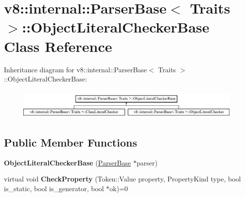 \hypertarget{classv8_1_1internal_1_1_parser_base_1_1_object_literal_checker_base}{}\section{v8\+:\+:internal\+:\+:Parser\+Base$<$ Traits $>$\+:\+:Object\+Literal\+Checker\+Base Class Reference}
\label{classv8_1_1internal_1_1_parser_base_1_1_object_literal_checker_base}
Inheritance diagram for v8\+:\+:internal\+:\+:Parser\+Base$<$ Traits $>$\+:\+:Object\+Literal\+Checker\+Base\+:\begin{figure}[H]
\begin{center}
\leavevmode
\includegraphics[height=1.542700cm]{classv8_1_1internal_1_1_parser_base_1_1_object_literal_checker_base}
\end{center}
\end{figure}
\subsection*{Public Member Functions}
\begin{DoxyCompactItemize}
\item 
{\bfseries Object\+Literal\+Checker\+Base} (\hyperlink{classv8_1_1internal_1_1_parser_base}{Parser\+Base} $\ast$parser)\hypertarget{classv8_1_1internal_1_1_parser_base_1_1_object_literal_checker_base_a309e477ac03af6a460e564af13400624}{}\label{classv8_1_1internal_1_1_parser_base_1_1_object_literal_checker_base_a309e477ac03af6a460e564af13400624}

\item 
virtual void {\bfseries Check\+Property} (Token\+::\+Value property, Property\+Kind type, bool is\+\_\+static, bool is\+\_\+generator, bool $\ast$ok)=0\hypertarget{classv8_1_1internal_1_1_parser_base_1_1_object_literal_checker_base_a732d9d070fbe3da4bc2fe018e84cdfd2}{}\label{classv8_1_1internal_1_1_parser_base_1_1_object_literal_checker_base_a732d9d070fbe3da4bc2fe018e84cdfd2}

\end{DoxyCompactItemize}
